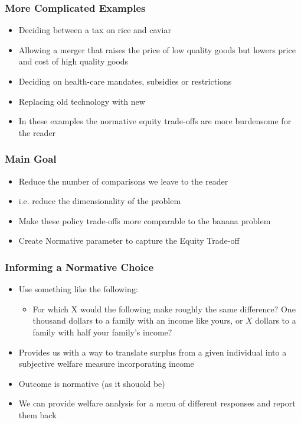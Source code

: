 \documentclass{beamer}
\begin{document}
\begin{frame}
\frametitle{More Complicated Examples}

\begin{itemize}
	\setlength{\itemsep}{5mm}
	\large
	\item Deciding between a tax on rice and caviar 
	\item Allowing a merger that raises the price of low quality goods but lowers price and cost of high quality goods 
	\item Deciding on health-care mandates, subsidies or restrictions 
	\item Replacing old technology with new
	\item In these examples the normative equity trade-offs are more burdensome for the reader 
	
\end{itemize}

\end{frame}


\begin{frame}
\frametitle{Main Goal}

\begin{itemize}
	\setlength{\itemsep}{5mm}
	
\large
		
	\item Reduce the number of comparisons we leave to the reader
	\item i.e. reduce the dimensionality of the problem 
	\item Make these policy trade-offs more comparable to the banana problem 
	\item Create Normative parameter to capture the Equity Trade-off

\end{itemize}

\end{frame}



\begin{frame}
\frametitle{Informing a Normative Choice}

\begin{itemize}
	
	\item Use something like the following:
	\begin{itemize}
		\item For which X would the following make roughly the same difference? One thousand dollars to a family with an income like yours, or $X$ dollars to a family with half your family's income? 
	\end{itemize}
	
	\item Provides us with a way to translate surplus from a given individual into a subjective welfare measure incorporating income
	\item Outcome is normative (as it shouold be) 
	\item We can provide welfare analysis for a menu of different responses and report them back
\end{itemize}	
\end{frame}
\end{document}
